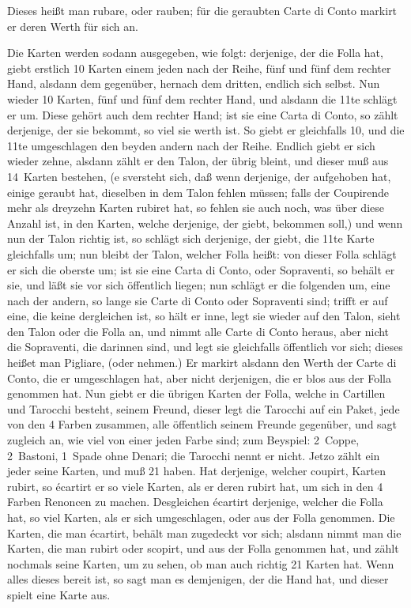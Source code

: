 \documentclass[11pt,a6paper,twoside]{article}
\begin{document}
Dieses heißt man rubare, oder rauben; für die geraubten Carte di Conto markirt er deren Werth für sich an.

Die Karten werden sodann ausgegeben, wie folgt: derjenige, der die Folla hat, giebt erstlich 10 Karten einem jeden nach der Reihe, fünf und fünf dem rechter Hand, alsdann dem gegenüber, hernach dem dritten, endlich sich selbst. Nun wieder 10 Karten, fünf und fünf dem rechter Hand, und alsdann die 11te schlägt er um. Diese gehört auch dem rechter Hand; ist sie eine Carta di Conto, so zählt derjenige, der sie bekommt, so viel sie werth ist. So giebt er gleichfalls 10, und die 11te umgeschlagen den beyden andern nach der Reihe. Endlich giebt er sich wieder zehne, alsdann zählt er den Talon, der übrig bleint, und dieser muß aus 14~Karten bestehen, (e sversteht sich, daß wenn derjenige, der aufgehoben hat, einige geraubt hat, dieselben in dem Talon fehlen müssen; falls der Coupirende mehr als dreyzehn Karten rubiret hat, so fehlen sie auch noch, was über diese Anzahl ist, in den Karten, welche derjenige, der giebt, bekommen soll,) und wenn nun der Talon richtig ist, so schlägt sich derjenige, der giebt, die 11te Karte gleichfalls um; nun bleibt der Talon, welcher Folla heißt: von dieser Folla schlägt er sich die oberste um; ist sie eine Carta di Conto, oder Sopraventi, so behält er sie, und läßt sie vor sich öffentlich liegen; nun schlägt er die folgenden um, eine nach der andern, so lange sie Carte di Conto oder Sopraventi sind; trifft er auf eine, die keine dergleichen ist, so hält er inne, legt sie wieder auf den Talon, sieht den Talon oder die Folla an, und nimmt alle Carte di Conto heraus, aber nicht die Sopraventi, die darinnen sind, und legt sie gleichfalls öffentlich vor sich; dieses heißet man Pigliare, (oder nehmen.) Er markirt alsdann den Werth der Carte di Conto, die er umgeschlagen hat, aber nicht derjenigen, die er blos aus der Folla genommen hat. Nun giebt er die übrigen Karten der Folla, welche in Cartillen und Tarocchi besteht, seinem Freund, dieser legt die Tarocchi auf ein Paket, jede von den 4 Farben zusammen, alle öffentlich seinem Freunde gegenüber, und sagt zugleich an, wie viel von einer jeden Farbe sind; zum Beyspiel: 2~Coppe, 2~Bastoni, 1~Spade ohne Denari; die Tarocchi nennt er nicht. Jetzo zählt ein jeder seine Karten, und muß 21 haben. Hat derjenige, welcher coupirt, Karten rubirt, so écartirt er so viele Karten, als er deren rubirt hat, um sich in den 4 Farben Renoncen zu machen. Desgleichen écartirt derjenige, welcher die Folla hat, so viel Karten, als er sich umgeschlagen, oder aus der Folla genommen. Die Karten, die man écartirt, behält man zugedeckt vor sich; alsdann nimmt man die Karten, die man rubirt oder scopirt, und aus der Folla genommen hat, und zählt nochmals seine Karten, um zu sehen, ob man auch richtig 21 Karten hat. Wenn alles dieses bereit ist, so sagt man es demjenigen, der die Hand hat, und dieser spielt eine Karte aus.
\end{document}

